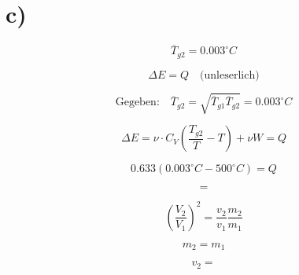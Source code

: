

\section*{c)}

\[
\overline{T}_{g2} = 0.003^\circ C
\]


\[
\Delta E = Q \quad \text{(unleserlich)}
\]

\[
\text{Gegeben:} \quad \overline{T}_{g2} = \sqrt{\overline{T}_{g1} \overline{T}_{g2}} = 0.003^\circ C
\]

\[
\Delta E = \nu \cdot C_V \left( \frac{T_{g2}}{T} - T \right) + \nu W = Q
\]

\[
0.633 (0.003^\circ C - 500^\circ C) = Q
\]

\[
=
\]

\[
\left( \frac{V_2}{V_1} \right)^2 = \frac{v_2}{v_1} \frac{m_2}{m_1}
\]

\[
m_2 = m_1
\]

\[
v_2 =
\]